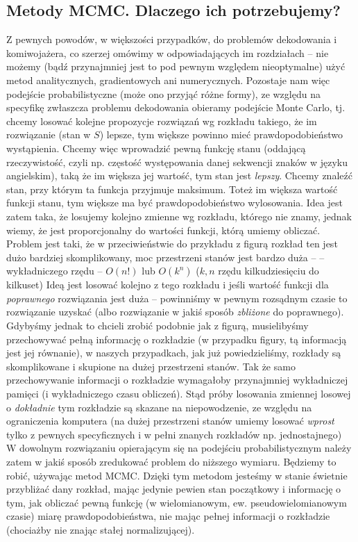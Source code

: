 \documentclass[a4paper]{article}
\begin{document}
\subsection{Metody MCMC. Dlaczego ich potrzebujemy?}
Z pewnych powodów, w większości przypadków, do problemów dekodowania i komiwojażera, co szerzej omówimy w odpowiadających im rozdziałach – nie możemy (bądź przynajmniej jest to pod pewnym względem nieoptymalne) użyć metod analitycznych, gradientowych ani numerycznych. Pozostaje nam więc podejście probabilistyczne (może ono przyjąć różne formy), ze względu na specyfikę zwłaszcza problemu dekodowania obieramy podejście Monte Carlo, tj. chcemy losować kolejne propozycje rozwiązań wg rozkładu takiego, że im rozwiązanie (stan w $S$) lepsze, tym większe powinno mieć prawdopodobieństwo wystąpienia.
Chcemy więc wprowadzić pewną funkcję stanu (oddającą rzeczywistość, czyli np. częstość występowania danej sekwencji znaków w języku angielskim), taką że im większa jej wartość, tym stan jest \textit{lepszy}. Chcemy znaleźć stan, przy którym ta funkcja przyjmuje maksimum. Toteż im większa wartość funkcji stanu, tym większe ma być prawdopodobieństwo wylosowania. Idea jest zatem taka, że losujemy kolejno zmienne wg rozkładu, którego nie znamy, jednak wiemy, że jest proporcjonalny do wartości funkcji, którą umiemy obliczać. Problem jest taki, że w przeciwieństwie do przykładu z figurą rozkład ten jest dużo bardziej skomplikowany, moc przestrzeni stanów jest bardzo duża – – wykładniczego rzędu – $O(n!)$ lub $O(k^n)$ ($k, n$ rzędu kilkudziesięciu do kilkuset) Ideą jest losować kolejno z tego rozkładu i jeśli wartość funkcji dla \textit{poprawnego} rozwiązania jest duża – powinniśmy w pewnym rozsądnym czasie to rozwiązanie uzyskać (albo rozwiązanie w jakiś sposób \textit{zbliżone} do poprawnego).
Gdybyśmy jednak to chcieli zrobić podobnie jak z figurą, musielibyśmy przechowywać pełną informację o rozkładzie (w przypadku figury, tą informacją jest jej równanie), w naszych przypadkach, jak już powiedzieliśmy, rozkłady są skomplikowane i skupione na dużej przestrzeni stanów. Tak że samo przechowywanie informacji o rozkładzie  wymagałoby przynajmniej wykładniczej pamięci (i wykładniczego czasu obliczeń). Stąd próby losowania zmiennej losowej o \textit{dokładnie} tym rozkładzie są skazane na niepowodzenie, ze względu na ograniczenia komputera (na dużej przestrzeni stanów umiemy losować \textit{wprost} tylko z pewnych specyficznych i w pełni znanych rozkładów np. jednostajnego)\\
W dowolnym rozwiązaniu opierającym się na podejściu probabilistycznym należy zatem w jakiś sposób zredukować problem do niższego wymiaru. Będziemy to robić, używając metod MCMC. Dzięki tym metodom jesteśmy w stanie świetnie przybliżać dany rozkład, mając jedynie pewien stan początkowy i informację o tym, jak obliczać pewną funkcję (w wielomianowym, ew. pseudowielomianowym czasie) miarę prawdopodobieństwa, nie mając pełnej informacji o rozkładzie (chociażby nie znając stałej normalizującej).
\end{document}
